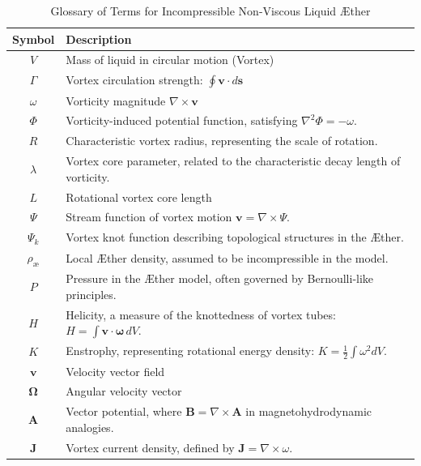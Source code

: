     \begin{table}[htbp]
        \centering
        \renewcommand{\arraystretch}{1.0}
        \begin{tabular}{c l}
            \toprule
            Symbol & Description \\
            \midrule
            \( V \) & Mass of liquid in circular motion (Vortex) \\
            \( \Gamma \) & Vortex circulation strength: \( \oint \mathbf{v} \cdot d\mathbf{s} \) \\
            \( \omega \) & Vorticity magnitude \(\nabla \times \mathbf{v} \) \\
            \( \Phi \) & Vorticity-induced potential function, satisfying \( \nabla^2 \Phi = -\omega \). \\
            \( R \) & Characteristic vortex radius, representing the scale of rotation. \\
            \( \lambda \) & Vortex core parameter, related to the characteristic decay length of vorticity. \\
            \( L \) & Rotational vortex core length \\
            \( \Psi \) & Stream function of vortex motion \( \mathbf{v} = \nabla \times \Psi \). \\
            \( \Psi_k \) & Vortex knot function describing topological structures in the Æther. \\
            \( \rho_\text{\ae} \) & Local Æther density, assumed to be incompressible in the model. \\
            \( P \) & Pressure in the Æther model, often governed by Bernoulli-like principles. \\
            \( H \) & Helicity, a measure of the knottedness of vortex tubes: \( H = \int \mathbf{v} \cdot \mathbf{\omega} \, dV \). \\
            \( K \) & Enstrophy, representing rotational energy density: \( K = \frac{1}{2} \int \omega^2 dV \). \\
            \( \mathbf{v} \) & Velocity vector field \\
            \( \mathbf{\Omega} \) & Angular velocity vector \\
            \( \mathbf{A} \) & Vector potential, where \( \mathbf{B} = \nabla \times \mathbf{A} \) in magnetohydrodynamic analogies. \\
            \( \mathbf{J} \) & Vortex current density, defined by \( \mathbf{J} = \nabla \times \omega \). \\
            \bottomrule
        \end{tabular}
        \caption{Glossary of Terms for Incompressible Non-Viscous Liquid Æther}
        \label{tab:symbols}
    \end{table}

